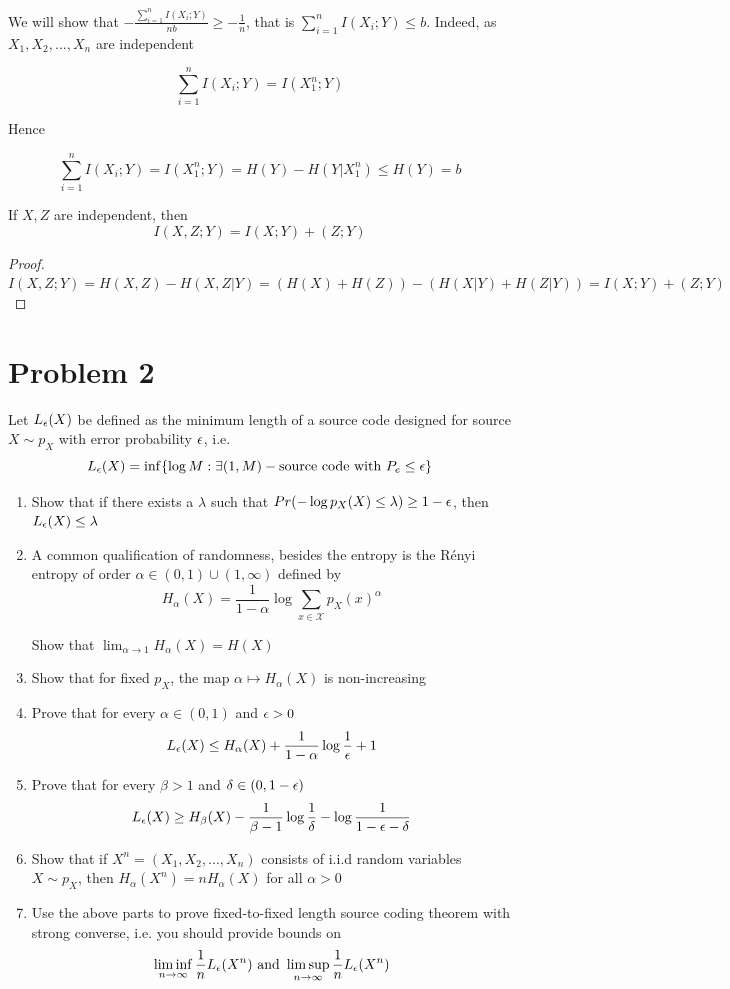 \documentclass{article}
\begin{document}
We will show that $- \frac{\sum_{i=1}^n I(X_i; Y)}{nb} \geq - \frac{1}{n}$, that is $\sum_{i=1}^n I(X_i; Y) \leq b$. Indeed, as $X_1, X_2, ..., X_n$ are independent

$$
    \sum_{i=1}^n I(X_i; Y) = I(X_1^n; Y)
$$

Hence

$$
    \sum_{i=1}^n I(X_i; Y) = I(X_1^n; Y) = H(Y) - H(Y|X_1^n) \leq H(Y) = b
$$

\begin{lemma}
If $X, Z$ are independent, then
$$
    I(X, Z; Y) = I(X; Y) + (Z; Y)
$$
\begin{proof}
    $
        I(X, Z; Y) = H(X, Z) - H(X, Z | Y) = (H(X) + H(Z)) - (H(X|Y) + H(Z|Y)) = I(X; Y) + (Z; Y)
    $
\end{proof}
\end{lemma}

\section{Problem 2}
Let $L_\epsilon(X)$ be defined as the minimum length of a source code designed for source $X \sim p_X$ with error probability $\epsilon$, i.e.
$$
    L_\epsilon(X) = \inf \{\log M: \exists (1, M)-\text{source code with } P_e \leq \epsilon\}
$$

\begin{enumerate}
\item Show that if there exists a $\lambda$ such that $Pr(-\log p_X(X) \leq \lambda) \geq 1 - \epsilon$, then $L_\epsilon(X) \leq \lambda$

\item A common qualification of randomness, besides the entropy is the  Rényi entropy of order $\alpha \in (0, 1) \cup (1, \infty)$ defined by
$$
    H_\alpha(X) = \frac{1}{1 - \alpha} \log \sum_{x \in \mathcal{X}} p_X(x)^\alpha
$$

Show that $\lim_{\alpha \to 1} H_\alpha(X) = H(X)$

\item Show that for fixed $p_X$, the map $\alpha \mapsto H_\alpha(X)$ is non-increasing

\item Prove that for every $\alpha \in (0, 1)$ and $\epsilon > 0$
$$
    L_\epsilon(X) \leq H_\alpha(X) + \frac{1}{1-\alpha} \log \frac{1}{\epsilon} + 1
$$

\item Prove that for every $\beta > 1$ and $\delta \in (0, 1-\epsilon)$
$$
    L_\epsilon(X) \geq H_\beta(X) - \frac{1}{\beta-1} \log \frac{1}{\delta} - \log \frac{1}{1-\epsilon-\delta}
$$

\item Show that if $X^n = (X_1, X_2, ..., X_n)$ consists of i.i.d random variables $X \sim p_X$, then $H_\alpha(X^n) = n H_\alpha(X)$ for all $\alpha > 0$

\item Use the above parts to prove fixed-to-fixed length source coding theorem with strong converse, i.e. you should provide bounds on
$$
    \liminf_{n \to \infty} \frac{1}{n} L_\epsilon(X^n) \text{ and } \limsup_{n \to \infty} \frac{1}{n} L_\epsilon(X^n)
$$
\end{enumerate}
\end{document}
